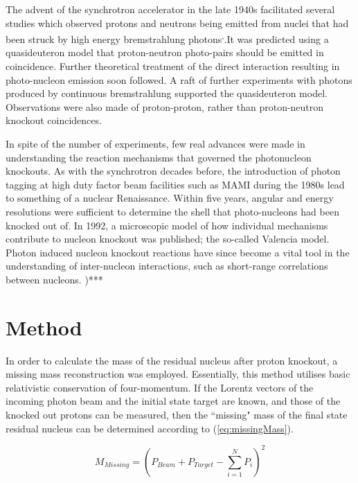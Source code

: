 \documentclass[a4paper,12pt]{article}
\begin{document}
The advent of the synchrotron accelerator in the late 1940s facilitated several studies which observed protons and neutrons being emitted from nuclei that had been struck by high energy bremstrahlung photons\cite{perlman}\textsuperscript{,}\cite{levinthal}{}.It was predicted using a quasideuteron model that proton-neutron photo-pairs should be emitted in coincidence\cite{Levinger}{}. Further theoretical treatment of the direct interaction resulting in photo-nucleon emission soon followed\cite{gottfried}{}. A raft of further experiments with photons produced by continuous bremstrahlung supported the quasideuteron model\cite{smith}{}. Observations were also made of proton-proton, rather than proton-neutron knockout coincidences\cite{weinstein}{}.

In spite of the number of experiments, few real advances were made in understanding the reaction mechanisms that governed the photonucleon knockouts. As with the synchrotron decades before, the introduction of photon tagging at high duty factor beam facilities such as MAMI during the 1980s\cite{anthony} lead to something of a nuclear Renaissance. Within five years, angular and energy resolutions were sufficient to determine the shell that photo-nucleons had been knocked out of\cite{dancer}{}. In 1992, a microscopic model of how individual mechanisms contribute to nucleon knockout was published; the so-called Valencia model\cite{valencia}{}. Photon induced nucleon knockout reactions have since become a vital tool in the understanding of inter-nucleon interactions, such as short-range correlations between nucleons\cite{giusti}{}.
)***

\section{Method}
In order to calculate the mass of the residual nucleus after proton knockout, a missing mass reconstruction was employed. Essentially, this method utilises basic relativistic conservation of four-momentum. If the Lorentz vectors of the incoming photon beam and the initial state target are known, and those of the knocked out protons can be measured, then the ``missing" mass of the final state residual nucleus can be determined according to (\ref{eq:missingMass}).

\begin{equation}
\label{eq:missingMass}
M_{Missing} = (P_{Beam} + P_{Target} - \sum\limits_{i=1}^{N} P_{i} )^{2}
\end{equation}
\end{document}
